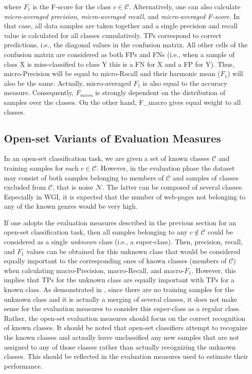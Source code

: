 \noindent 
where $F_c$ is the F-score for the class $c \in \mathcal{C}$. Alternatively, one can also calculate \textit{micro-averaged precision}, \textit{micro-averaged recall}, and \textit{micro-averaged F-score}. In that case, all data samples are taken together and a single precision and recall value is calculated for all classes cumulatively. TPs correspond to correct predictions, i.e., the diagonal values in the confusion matrix.  All other cells of the confusion matrix are considered as both FPs and FNs (i.e., when a sample of class X is miss-classified to class Y this is a FN for X and a FP for Y). Thus, micro-Precision will be equal to micro-Recall and their harmonic mean  ($F_{1}$) will also be the same. Actually, micro-averaged $F_{1}$ is also equal to the accuracy measure. Consequently, $F_{micro}$ is strongly dependent on the distribution of samples over the classes. On the other hand, F_{macro} gives equal weight to all classes.

\subsection{Open-set Variants of Evaluation Measures}\label{chap:eval_methods:sec:openset_measures}

In an open-set classification task, we are given a set of known classes $\mathcal{C}$ and training samples for each $c \in \mathcal{C}$. However, in the evaluation phase the dataset may consist of both samples belonging to members of $\mathcal{C}$ and samples of classes excluded from $\mathcal{C}$, that is noise $\mathcal{N}$. The latter can be composed of several classes. Especially in WGI, it is expected that the number of web-pages not belonging to any of the known genres would be very high. 

If one adopts the evaluation measures described in the previous section for an open-set classification task, then all samples belonging to any $c \notin \mathcal{C}$ could be considered as a single \textit{unknown} class (i.e., a super-class). Then, precision, recall, and $F_{1}$ values can be obtained for this unknown class that would be considered equally important to the corresponding ones of known classes (members of $\mathcal{C}$) when calculating macro-Precision, macro-Recall, and macro-$F_{1}$. However, this implies that TPs for the unknown class are equally important with TPs for a known class. As demonstrated in \parencite{mendesjunior2016}, since there are no training samples for the unknown class and it is actually a merging of several classes, it does not make sense for the evaluation measures to consider this super-class as a regular class. Rather, the open-set evaluation measures should focus on the correct recognition of known classes. It should be noted that open-set classifiers attempt to recognize the known classes and actually leave unclassified any new samples that are not assigned to any of those classes rather than actually recognizing the unknown classes. This should be reflected in the evaluation measures used to estimate their performance. 

